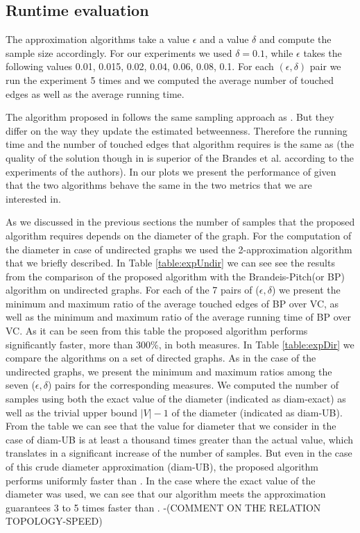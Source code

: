 \subsection{Runtime evaluation}\label{sec:runtime}
The approximation algorithms take a value $\epsilon$ and a value $\delta$ and compute the sample size accordingly.
For our experiments we used $\delta=0.1$, while $\epsilon$ takes the following values  0.01, 0.015, 0.02, 0.04, 0.06, 0.08, 0.1. 
For each $(\epsilon,\delta)$ pair we run the experiment 5 times and we computed the average number of touched edges as well as the average running time.

The algorithm proposed in \cite{GeisbergerSS08} follows the same sampling approach as \cite{BrandesP07}.
But they differ on the way they update the estimated betweenness.
Therefore the running time and the number of touched edges that algorithm \cite{GeisbergerSS08} requires is the same as \cite{BrandesP07} (the quality of the solution though in \cite{GeisbergerSS08} is superior of the Brandes et al.\cite{BrandesP07} according to the experiments of the authors).
In our plots we present the performance of \cite{BrandesP07} given that the two algorithms behave the same in the two metrics that we are interested in.


As we discussed in the previous sections the number of samples that the proposed algorithm requires depends on the diameter of the graph.
For the computation of the diameter in case of undirected graphs we used the 2-approximation algorithm that we briefly described. 
In Table \ref{table:expUndir} we can see see the results from the comparison of the proposed algorithm with the Brandeis-Pitch(or BP) algorithm on undirected graphs.
For each of the 7 pairs of ($\epsilon,\delta$) we present the minimum and maximum ratio of the average touched edges of BP over VC, as well as the minimum and maximum ratio of the average running time of BP over VC.
As it can be seen from this table the proposed algorithm performs significantly faster, more than 300\%, in both measures.
In Table \ref{table:expDir} we compare the algorithms on a set of directed graphs.
As in the case of the undirected graphs, we present the minimum and maximum ratios among the seven ($\epsilon,\delta$) pairs for the corresponding measures.
We computed the number of samples using both the exact value of the diameter (indicated as diam-exact) as well as the trivial upper bound $|V|-1$ of the diameter (indicated as diam-UB).
From the table we can see that the value for diameter that we consider in the case of diam-UB is at least a thousand times greater than the actual value, which translates in a significant increase of the number of samples.
But even in the case of this crude diameter approximation (diam-UB), the proposed algorithm performs uniformly faster than \cite{BrandesP07}.
In the case where the exact value of the diameter was used, we can see that our algorithm meets the approximation guarantees 3 to 5 times faster than  \cite{BrandesP07}.
 \XXX-(COMMENT ON THE RELATION TOPOLOGY-SPEED)




